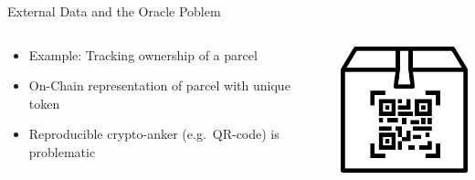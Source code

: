 \documentclass[handout]{beamer}
\begin{document}
\begin{frame}{External Data and the Oracle Poblem}
	\begin{columns}
		\begin{column}{0.6\textwidth}
			\begin{itemize}[<+->]
				\item Example: Tracking ownership of a parcel
				\item On-Chain representation of parcel with unique token
				\item Reproducible crypto-anker (e.g.~QR-code) is problematic
			\end{itemize}
		\end{column}
		\begin{column}{0.4\textwidth}
			\includegraphics[width=4cm]{../assets/images/parcel.png}
		\end{column}
	\end{columns}
\end{frame}

\end{document}
